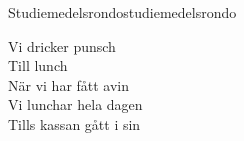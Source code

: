 \begin{song}{Studiemedelsrondo}{studiemedelsrondo}
\begin{vers}
\repopen Vi dricker punsch\\
Till lunch\\
När vi har fått avin\\
Vi lunchar hela dagen\\
Tills kassan gått i sin \repclose\\
\end{vers}
\end{song}
